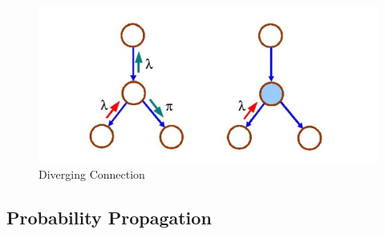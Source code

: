 \documentclass[12pt,twoside]{article}
\begin{document}
\begin{enumerate}
\begin{figure}[H]
\begin{center}
\includegraphics[width = 0.55\hsize]{./figures/DivergingConnection.png} %
\caption{Diverging Connection} %
\label{fig:NaiveBayes} %
\end{center}
\end{figure}

\end{enumerate}


\subsection{Probability Propagation}
\end{document}
